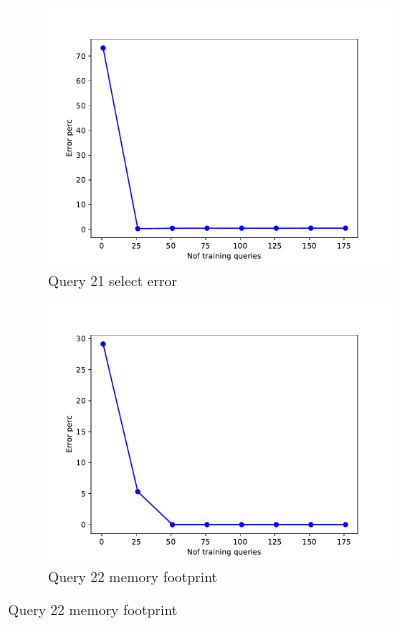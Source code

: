 \begin{figure}[!htb]
     \begin{subfigure}[t]{0.5\textwidth}
       \includegraphics[scale=0.4]{figs/tpch10/tpch10_sel21_error.pdf}
       \caption{Query 21 select error}
       \label{fig:tpch_sel21}
     \end{subfigure}
     \begin{subfigure}[t]{0.5\textwidth}
       \includegraphics[scale=0.4]{figs/tpch10/tpch10_sel22_error.pdf}
       \caption{Query 22 memory footprint}
       \label{fig:tpch_sel22}
      \end{subfigure}
\end{figure}



